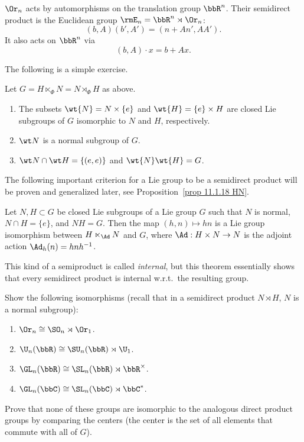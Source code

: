 \begin{example}
    $\Or_n$ acts by automorphisms on the translation group $\bbR^n$. Their semidirect product is the Euclidean group $\rmE_n=\bbR^n\rtimes \Or_n$:
    \[(b,A)(b',A')=(n+An',AA').\]
    It also acts on $\bbR^n$ via 
    \[(b,A)\cdot x=b+Ax.\]
\end{example}


The following is a simple exercise.
\begin{prop}
    Let $G=H\ltimes_\Phi N=N\rtimes_\Phi H$ as above.
    \begin{enumerate}[label=(\alph*)]
        \item The subsets $\wt{N}=N\times\{e\}$ and $\wt{H}=\{e\}\times H$ are closed Lie subgroups of $G$ isomorphic to $N$ and $H$, respectively.
        \item $\wt N$ is a normal subgroup of $G$.
        \item $\wt N\cap \wt H=\{(e,e)\}$ and $\wt{N}\wt{H}=G$.
    \end{enumerate}
\end{prop}

The following important criterion for a Lie group to be a semidirect product will be proven and generalized later, see Proposition~\ref{prop 11.1.18 HN}.

\begin{prop}
    Let $N,H\subset G$ be closed Lie subgroups of a Lie group $G$ such that $N$ is normal, $N\cap H=\{e\}$, and $NH=G$. Then the map $(h,n)\mapsto hn$ is a Lie group isomorphism between $H\ltimes_{\Ad} N$ and $G$, where $\Ad:H\times N\to N$ is the adjoint action $\Ad_h(n)=hnh^{-1}$.
\end{prop}

This kind of a semiproduct is called \emph{internal}, but this theorem essentially shows that every semidirect product is internal w.r.t.\ the resulting group.

\begin{xca}
    Show the following isomorphisms (recall that in a semidirect product $N\rtimes H$, $N$ is a normal subgroup):
    \begin{enumerate}[label=(\alph*)]
        \item $\Or_n\cong \SO_n\rtimes \Or_1$.
        \item $\U_n(\bbR)\cong \SU_n(\bbR)\rtimes \U_1$.
        \item $\GL_n(\bbR)\cong \SL_n(\bbR)\rtimes \bbR^\times$.
        \item $\GL_n(\bbC)\cong \SL_n(\bbC)\rtimes \bbC^\ast$.
    \end{enumerate}
    Prove that none of these groups are isomorphic to the analogous direct product groups by comparing the centers (the center is the set of all elements that commute with all of $G$).
\end{xca}

